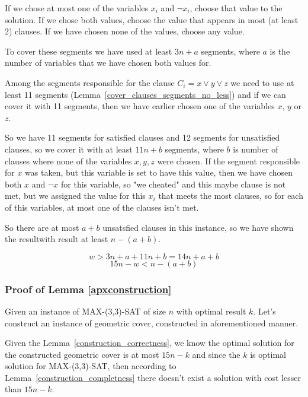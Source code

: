 If we chose at most one of the variables $x_i$ and $\neg x_i$,
choose that value to the solution. If we chose both values,
choose the value that appears in most (at least 2) clauses.
If we have chosen none of the values, choose any value.

To cover these segments we have used at least $3n + a$ segments,
where $a$ is the number of variables that we have chosen both
values for.

Among the segments responsible for the clause $C_i = x \lor y \lor z$
we need to use at least 11 segments
(Lemma~\ref{cover_clauses_segments_no_less})
and if we can cover it with 11 segments, then we have 
earlier chosen
one of the variables $x$, $y$ or $z$.

So we have 11 segments for satisfied clauses and 12 segments
for unsatisfied clauses, so we cover it with 
at least $11n + b$ segments, where $b$ is number of clauses
where none of the variables $x, y, z$ were chosen.
If the segment responsible for $x$ was taken,
but this variable is set to have this value,
then we have chosen both $x$ and $\neg x$ for this variable,
so "we cheated" and this maybe clause is not met,
but we assigned the value for this $x_i$ that meets
the most clauses, so for each of this variables,
at most one of the clauses isn't met.

So there are at most $a+b$ unsatsfied clauses in this instance,
so we have shown the resultwith result at least $n-(a+b)$.

$$w > 3n + a + 11n + b = 14n + a + b$$
$$15n - w < n - (a+b)$$

\subsubsection{Proof of Lemma \ref{apxconstruction}}
Given an instance of MAX-(3,3)-SAT of size $n$
with optimal result $k$.
Let's construct an instance of geometric cover,
constructed in aforementioned manner.

Given the Lemma~\ref{construction_correctness}, we know
the optimal solution for the constructed geometric cover is
at most $15n - k$ and since the $k$ is optimal solution
for MAX-(3,3)-SAT, then according to Lemma~\ref{construction_completness}
there doesn't exist a solution with cost lesser than $15n - k$.
